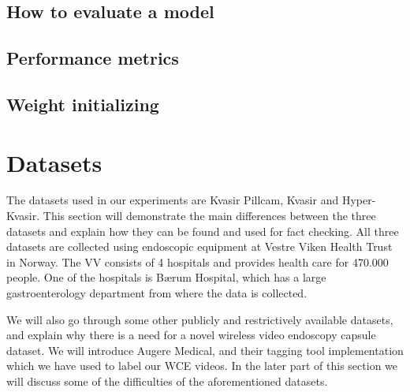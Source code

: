 \documentclass[thesis.tex]{subfiles}
\begin{document}
\subsection{How to evaluate a model}


\subsection{Performance metrics}


\subsection{Weight initializing}







\section{Datasets} \label{sec:available_datasets}

The datasets used in our experiments are Kvasir Pillcam, Kvasir and Hyper-Kvasir. This section will demonstrate the main differences between the three datasets and explain how they can be found and used for fact checking. All three datasets are collected using endoscopic equipment at Vestre Viken Health Trust in Norway. The VV consists of 4 hospitals and provides health care for 470.000 people. One of the hospitals is Bærum Hospital, which has a large gastroenterology department from where the data is collected.

We will also go through some other publicly and restrictively available datasets, and explain why there is a need for a novel wireless video endoscopy capsule dataset. We will introduce Augere Medical, and their tagging tool implementation which we have used to label our WCE videos. In the later part of this section we will discuss some of the difficulties of the aforementioned datasets.
\end{document}

